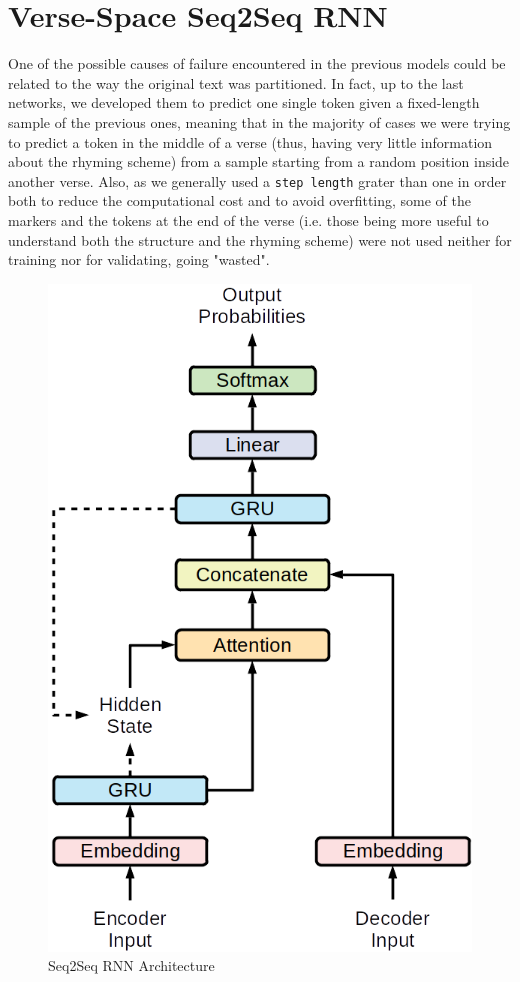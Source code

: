 \section{Verse-Space Seq2Seq RNN}

One of the possible causes of failure encountered in the previous models could be related to the way the original text was partitioned.
In fact, up to the last networks, we developed them to predict one single token given a fixed-length sample of the previous ones, meaning that in the majority of cases we were trying to predict a token in the middle of a verse (thus, having very little information about the rhyming scheme) from a sample starting from a random position inside another verse.
Also, as we generally used a \texttt{step length} grater than one in order both to reduce the computational cost and to avoid overfitting, some of the markers and the tokens at the end of the verse (i.e. those being more useful to understand both the structure and the rhyming scheme) were not used neither for training nor for validating, going "wasted".

\begin{figure}[!htb]
    \centering
    \includegraphics[scale=0.65]{images/model-3.png}%
    \caption{Seq2Seq RNN Architecture}%
    \label{seq2seq}
\end{figure}

